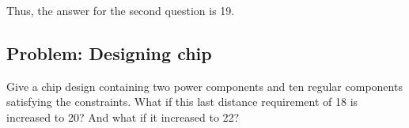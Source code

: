 \documentclass[12pt]{article}
\begin{document}


Thus, the answer for the second question is 19.







\pagebreak

\subsection*{Problem: Designing chip}
Give a chip design containing two power components and ten
regular components satisfying the constraints. What if this last distance requirement of 18 is increased to 20? And what if it increased to 22? 
\end{document}
